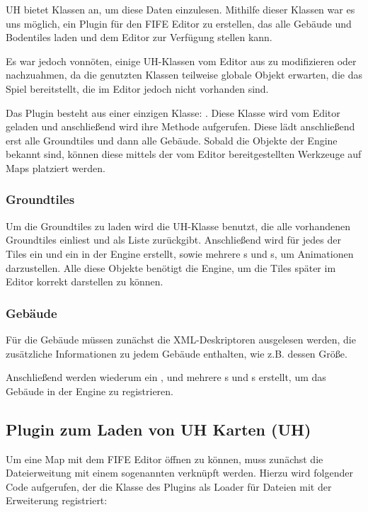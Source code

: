 UH bietet Klassen an, um diese Daten einzulesen.
Mithilfe dieser Klassen war es uns möglich, ein
Plugin für den FIFE Editor zu erstellen, das alle Gebäude und Bodentiles
laden und dem Editor zur Verfügung stellen kann.

Es war jedoch vonnöten, einige UH-Klassen vom Editor aus zu
modifizieren oder nachzuahmen, da die genutzten Klassen teilweise
globale Objekt erwarten, die das Spiel bereitstellt, die im Editor
jedoch nicht vorhanden sind.

Das Plugin besteht aus einer einzigen Klasse: . Diese
Klasse wird vom Editor geladen und anschließend wird ihre  Methode
aufgerufen. Diese lädt anschließend erst alle Groundtiles und dann alle Gebäude.
Sobald die Objekte der Engine bekannt sind, können diese mittels der vom Editor
bereitgestellten Werkzeuge auf Maps platziert werden.

\subsubsection{Groundtiles}
Um die Groundtiles zu laden wird die UH-Klasse  benutzt,
die alle vorhandenen Groundtiles einliest und als Liste zurückgibt. Anschließend
wird für jedes der Tiles ein  und ein  in der
Engine erstellt, sowie mehrere s und s, um Animationen darzustellen.
Alle diese Objekte benötigt die Engine, um die Tiles später im Editor korrekt
darstellen zu können.

\subsubsection{Gebäude}
Für die Gebäude müssen zunächst die XML-Deskriptoren ausgelesen werden, die
zusätzliche Informationen zu jedem Gebäude enthalten, wie z.B. dessen Größe.

Anschließend werden wiederum ein ,  und
mehrere s und s erstellt, um das Gebäude in
der Engine zu registrieren.


\subsection{Plugin zum Laden von UH Karten (UH)}
\label{sec:registerMapLoader}
Um eine Map mit dem FIFE Editor öffnen zu können, muss zunächst die
Dateierweitung mit einem sogenannten  verknüpft werden.
Hierzu wird folgender Code
aufgerufen, der die Klasse  des  Plugins
als Loader für Dateien mit der Erweiterung  registriert:

